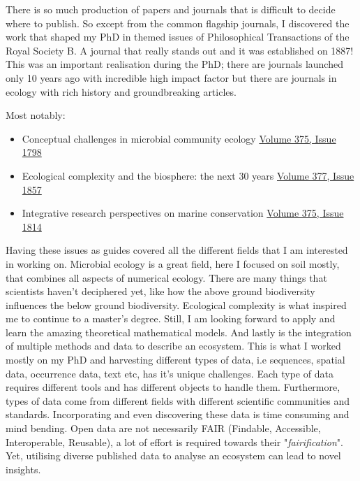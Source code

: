 \documentclass[
11pt, %
english, %
singlespacing, %
liststotoc, %
toctotoc, %
headsepline, %
]{MastersDoctoralThesis} %
\begin{document}
There is so much production of papers and journals that is difficult to decide where to publish. 
So except from the common flagship journals, I discovered the work that shaped my 
PhD in themed issues of Philosophical Transactions of the Royal Society B.
A journal that really stands out and it was established on 1887! This was an
important realisation during the PhD; there are journals launched only 10 years
ago with incredible high impact factor but there are journals in ecology
with rich history and groundbreaking articles.

Most notably:

\begin{itemize}
    \item Conceptual challenges in microbial community ecology \href{https://doi.org/10.1098/rstb.2019.0241}{Volume 375, Issue 1798}
    \item Ecological complexity and the biosphere: the next 30 years \href{https://doi.org/10.1098/rstb.2021.0376}{Volume 377, Issue 1857}
    \item Integrative research perspectives on marine conservation \href{https://doi.org/10.1098/rstb.2019.0444}{Volume 375, Issue 1814}
\end{itemize}

Having these issues as guides covered all the different fields that I am interested 
in working on. Microbial ecology is a great field, here I focused on soil mostly, that
combines all aspects of numerical ecology. There are many things that scientists 
haven't deciphered yet, like how the above ground biodiversity influences the below
ground biodiversity. Ecological complexity is what inspired me to continue to a 
master's degree. Still, I am looking forward to apply and learn the amazing 
theoretical mathematical models. And lastly is the integration of multiple methods 
and data to describe an ecosystem. This is what I worked mostly on my PhD and 
harvesting different types of data, i.e sequences, spatial data, occurrence data, 
text etc, has it's unique challenges. Each type of data requires different tools and has 
different objects to handle them. Furthermore, types of data come from different 
fields with different scientific communities and standards. Incorporating and even 
discovering these data is time consuming and mind bending. Open data are not 
necessarily FAIR (Findable, Accessible, Interoperable, Reusable), a lot of effort
is required towards their "\textit{fairification}".
Yet, utilising diverse 
published data to analyse an ecosystem can lead to novel insights. 
\end{document}
